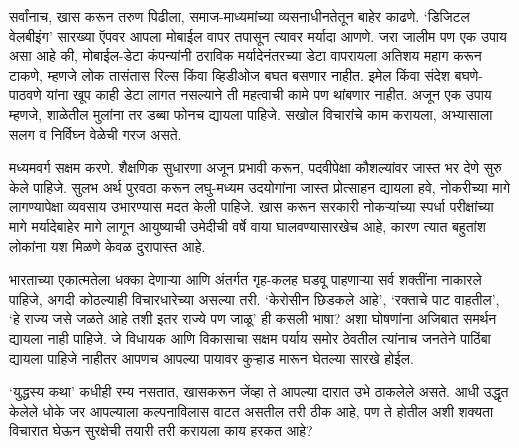 सर्वांनाच, खास करून तरुण पिढीला, समाज-माध्यमांच्या व्यसनाधीनतेतून बाहेर काढणे. ‘डिजिटल वेलबीइंग’ सारख्या ऍपवर आपला मोबाईल वापर तपासून त्यावर मर्यादा आणणे. जरा जालीम पण एक उपाय असा आहे की, मोबाईल-डेटा कंपन्यांनी ठराविक मर्यादेनंतरच्या डेटा वापरायला अतिशय महाग करून टाकणे, म्हणजे लोक तासंतास रिल्स किंवा व्हिडीओज बघत बसणार नाहीत. इमेल किंवा संदेश बघणे-पाठवणे यांना खूप काही डेटा लागत नसल्याने ती महत्वाची कामे पण थांबणार नाहीत. अजून एक उपाय म्हणजे, शाळेतील मुलांना तर डब्बा फोनच द्यायला पाहिजे. सखोल विचारांचे काम करायला, अभ्यासाला सलग व निर्विघ्न वेळेची गरज असते.

मध्यमवर्ग सक्षम करणे. शैक्षणिक सुधारणा अजून प्रभावी करून, पदवीपेक्षा कौशल्यांवर जास्त भर देणे सुरु केले पाहिजे. सुलभ अर्थ पुरवठा करून लघु-मध्यम उदयोगांना जास्त प्रोत्साहन द्यायला हवे, नोकरीच्या मागे लागण्यापेक्षा व्यवसाय उभारण्यास मदत केली पाहिजे. खास करून सरकारी नोकऱ्यांच्या स्पर्धा परीक्षांच्या मागे मर्यादेबाहेर मागे लागून आयुष्याची उमेदीची वर्षे वाया घालवण्यासारखेच आहे, कारण त्यात बहुतांश लोकांना यश मिळणे केवळ दुरापास्त आहे.

भारताच्या एकात्मतेला धक्का देणाऱ्या आणि अंतर्गत गृह-कलह घडवू पाहणाऱ्या सर्व शक्तींना नाकारले पाहिजे, अगदी कोठल्याही विचारधारेच्या असल्या तरी. ‘केरोसीन छिडकले आहे’, ‘रक्ताचे पाट वाहतील’, ‘हे राज्य जसे जळते आहे तशी इतर राज्ये पण जाळू’ ही कसली भाषा? अशा घोषणांना अजिबात समर्थन द्यायला नाही पाहिजे. जे विधायक आणि विकासाचा सक्षम पर्याय समोर ठेवतील त्यांनाच जनतेने पाठिंबा द्यायला पाहिजे नाहीतर आपणच आपल्या पायावर कुऱ्हाड मारून घेतल्या सारखे होईल.

‘युद्धस्य कथा’ कधीही रम्य नसतात, खासकरून जेंव्हा ते आपल्या दारात उभे ठाकलेले असते. आधी उद्धृत केलेले धोके जर आपल्याला कल्पनाविलास वाटत असतील तरी ठीक आहे, पण ते होतील अशी शक्यता विचारात घेऊन सुरक्षेची तयारी तरी करायला काय हरकत आहे?